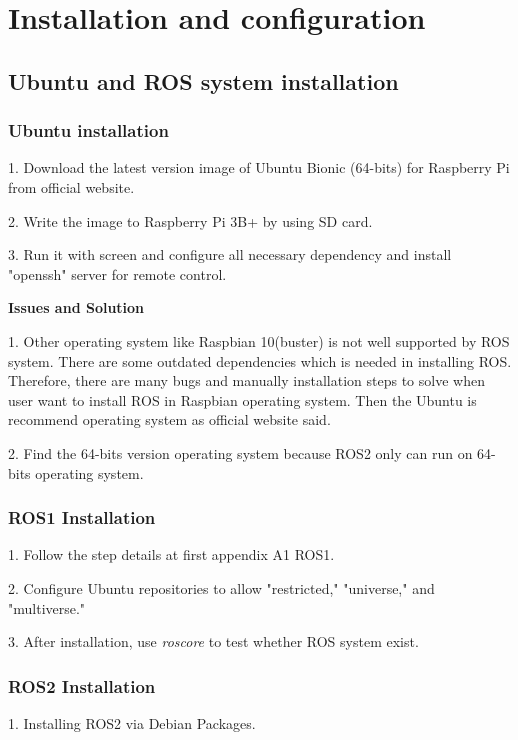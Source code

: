\documentclass{mproj}
\begin{document}
\chapter{Installation and configuration}

\section{Ubuntu and ROS system installation}

\subsection{Ubuntu installation}
1. Download the latest version image of Ubuntu Bionic (64-bits) for Raspberry Pi from official website.

2. Write the image to Raspberry Pi 3B+ by using SD card.

3. Run it with screen and configure all necessary dependency and install "openssh" server for remote control.
 
\textbf{Issues and Solution} 

1. Other operating system like Raspbian 10(buster) is not well supported by ROS system. There are some outdated dependencies which is needed in installing ROS. Therefore, there are many bugs and manually installation steps to solve when user want to install ROS in Raspbian operating system. Then the Ubuntu is recommend operating system as official website said.

2. Find the 64-bits version operating system because ROS2 only can run on 64-bits operating system.

\subsection{ROS1 Installation}

1. Follow the step details at first appendix A1 ROS1.

2. Configure Ubuntu repositories to allow "restricted," "universe," and "multiverse."

3. After installation, use \textit{roscore} to test whether ROS system exist.

\subsection{ROS2 Installation}

1. Installing ROS2 via Debian Packages.
\end{document}
